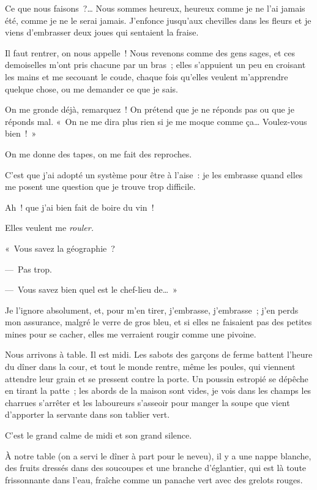\documentclass[french,twoside]{book} %
\begin{document}
Ce que nous faisons ?… Nous sommes heureux, heureux comme je ne l’ai jamais été, comme je ne le serai jamais. J’enfonce jusqu’aux chevilles dans les fleurs et je viens d’embrasser deux joues qui sentaient la fraise.\par
\bigbreak
\noindent Il faut rentrer, on nous appelle ! Nous revenons comme des gens sages, et ces demoiselles m’ont pris chacune par un bras ; elles s’appuient un peu en croisant les mains et me secouant le coude, chaque fois qu’elles veulent m’apprendre quelque chose, ou me demander ce que je sais.\par
On me gronde déjà, remarquez ! On prétend que je ne réponds pas ou que je réponds mal. « On ne me dira plus rien si je me moque comme ça… Voulez-vous bien ! »\par
On me donne des tapes, on me fait des reproches.\par
C’est que j’ai adopté un système pour être à l’aise : je les embrasse quand elles me posent une question que je trouve trop difficile.\par
Ah ! que j’ai bien fait de boire du vin !\par
Elles veulent me \emph{rouler.}\par
« Vous savez la géographie ?\par
— Pas trop.\par
— Vous savez bien quel est le chef-lieu de… »\par
Je l’ignore absolument, et, pour m’en tirer, j’embrasse, j’embrasse ; j’en perds mon assurance, malgré le verre de gros bleu, et si elles ne faisaient pas des petites mines pour se cacher, elles me verraient rougir comme une pivoine.\par
\bigbreak
\noindent Nous arrivons à table. Il est midi. Les sabots des garçons de ferme battent l’heure du dîner dans la cour, et tout le monde rentre, même les poules, qui viennent attendre leur grain et se pressent contre la porte. Un poussin estropié se dépêche en tirant la patte ; les abords de la maison sont vides, je vois dans les champs les charrues s’arrêter et les laboureurs s’asseoir pour manger la soupe que vient d’apporter la servante dans son tablier vert.\par
C’est le grand calme de midi et son grand silence.\par
\bigbreak
\noindent À notre table (on a servi le dîner à part pour le neveu), il y a une nappe blanche, des fruits dressés dans des soucoupes et une branche d’églantier, qui est là toute frissonnante dans l’eau, fraîche comme un panache vert avec des grelots rouges.\par
\end{document}

